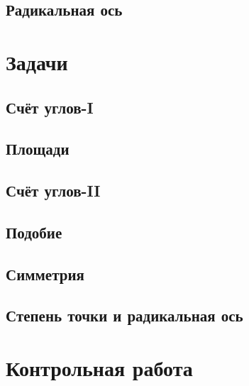 \documentclass[twoside]{article}
\begin{document}
\subsection{Радикальная ось}


\newpage
\renewcommand{\thesubsection}{\roman{subsection}}
\setcounter{subsection}{0}

\section*{Задачи}
\subsection{Счёт углов-I}

\subsection{Площади}
% 
\subsection{Счёт углов-II}

\subsection{Подобие}
% 
\subsection{Симметрия}
% 
\subsection{Степень точки и радикальная ось}


\newpage
{}
\section*{Контрольная работа}
% 
\end{document}
